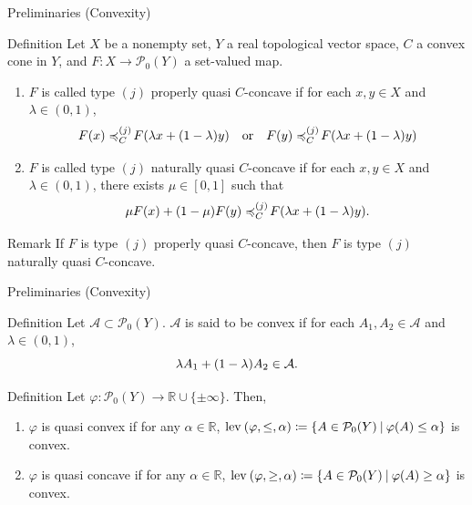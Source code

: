 \documentclass[aspectratio=169, dvipdfmx, 11pt]{beamer}
\newcommand{\RealNumberSet}{\mathbb{R}}
\newcommand{\OrderingLevelSets}[3]{\text{\rm lev\:$({#1}, {#2}, {#3})$}} %
\newcommand{\pow}[1]{\mathcal{P}_{0}(#1)}
\newcommand{\SetForm}[2]{
  \{{#1}\:|\:{#2}\}
}
\newcommand{\setrel}[2]{\preccurlyeq^{(#1)}_{#2}\!}
\begin{document}
\begin{frame}{Preliminaries (Convexity)}
  \begin{block}{Definition}
    Let $X$ be a nonempty set, $Y$ a real topological vector space, $C$ a convex cone in $Y$, and $F\colon X \to \pow{Y}$ a set-valued map.
    \begin{enumerate}
      \item $F$ is called type $(j)$ properly quasi $C$-concave if for each $x,y \in X$ and $\lambda \in (0,1)$,
            \begin{equation}
              F(x) \setrel{j}{C} F(\lambda x + (1-\lambda)y) \quad \text{or} \quad F(y) \setrel{j}{C} F(\lambda x + (1-\lambda)y) \notag
            \end{equation}
      \item $F$ is called type $(j)$ naturally quasi $C$-concave if for each $x,y \in X$ and $\lambda \in (0,1)$, there exists $\mu \in [0,1]$ such that
            \begin{equation}
              \mu F(x) + (1-\mu) F(y) \setrel{j}{C} F(\lambda x + (1-\lambda)y). \notag
            \end{equation}
    \end{enumerate}
  \end{block}
  \begin{alertblock}{Remark}
    If $F$ is type $(j)$ properly quasi $C$-concave,
    then $F$ is type $(j)$ naturally quasi $C$-concave.
  \end{alertblock}
\end{frame}

\begin{frame}{Preliminaries (Convexity)}
  \begin{block}{Definition \cite{MR3458699}}
    Let $\mathcal{A} \subset \pow{Y}$. $\mathcal{A}$ is said to be convex if for each $A_1, A_2 \in \mathcal{A}$ and $\lambda \in (0,1)$,
    \begin{equation}
      \lambda A_1 + (1-\lambda) A_2 \in \mathcal{A}. \notag
    \end{equation}
  \end{block}

  \begin{block}{Definition \cite{MR3458699}}
    Let $\varphi \colon \pow{Y} \to \RealNumberSet \cup \{\pm \infty\}$. Then,
    \begin{enumerate}
      \item $\varphi$ is quasi convex if for any $\alpha \in \RealNumberSet$,
            $\OrderingLevelSets{\varphi}{\leq}{\alpha} \coloneqq \SetForm{A \in \pow{Y}}{\varphi(A) \leq \alpha}$ is convex.
      \item $\varphi$ is quasi concave if for any $\alpha \in \RealNumberSet$,
            $\OrderingLevelSets{\varphi}{\geq}{\alpha} \coloneqq \SetForm{A \in \pow{Y}}{\varphi(A) \geq \alpha}$ is convex.
    \end{enumerate}
  \end{block}
\end{frame}
\end{document}
